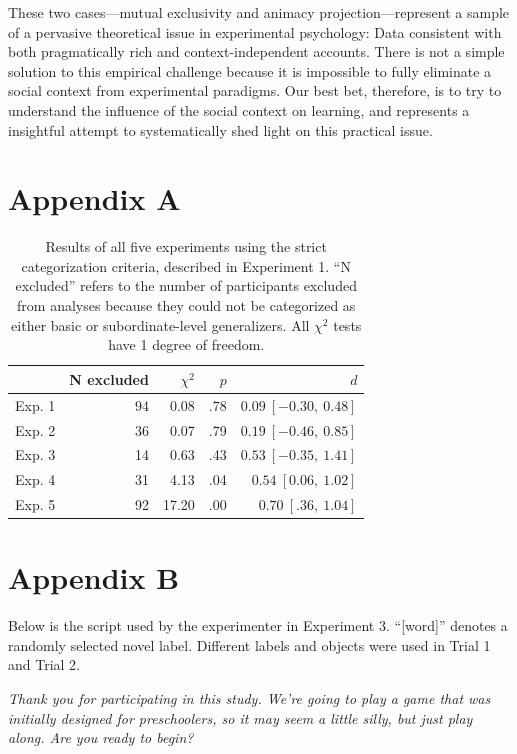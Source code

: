 \documentclass[man]{apa2}
\begin{document}
These two cases---mutual exclusivity and animacy projection---represent a sample of a pervasive theoretical issue in experimental psychology: Data consistent with both pragmatically rich and context-independent accounts. There is not a simple solution to this empirical challenge because it is impossible to fully eliminate a social context from experimental paradigms. Our best bet, therefore, is to try to understand the influence of the social context on learning, and  represents a insightful attempt to systematically shed light on this practical issue.

\section{Appendix A}

\begin{table}[h]
\centering
\begin{tabular}{rrrrr}
 \hline
 & N excluded & $\chi^2$ & $p$ & $d$ \\ 
 \hline
Exp. 1 & 94 & 0.08 & .78 & $0.09\ [-0.30,\ 0.48]$\\ 
Exp. 2 & 36 & 0.07 & .79 & $0.19\ [-0.46,\ 0.85]$ \\ 
Exp. 3 & 14 & 0.63 & .43 & $0.53\ [-0.35,\ 1.41]$ \\ 
Exp. 4 & 31 & 4.13 & .04 & $0.54\ [0.06,\ 1.02]$\\ 
Exp. 5 & 92 & 17.20 &  .00 & $0.70\ [.36,\ 1.04]$\\ 
 \hline
\end{tabular}
\caption{Results of all five experiments using the strict categorization criteria, described in Experiment 1. ``N excluded'' refers to the number of participants excluded from analyses because they could not be categorized as either basic or subordinate-level generalizers. All $\chi^2$ tests have 1 degree of freedom. }
\label{strictResults}
\end{table}


\section{Appendix B}
Below is the script used by the experimenter in Experiment 3. ``[word]'' denotes a randomly selected novel label. Different labels and objects were used in Trial 1 and Trial 2. 

\vspace{5mm}

{\it Thank you for participating in this study. We're going to play a game that was initially designed for preschoolers, so it may seem a little silly, but just play along. Are you ready to begin?}
\vspace{2.5mm}
\end{document}
